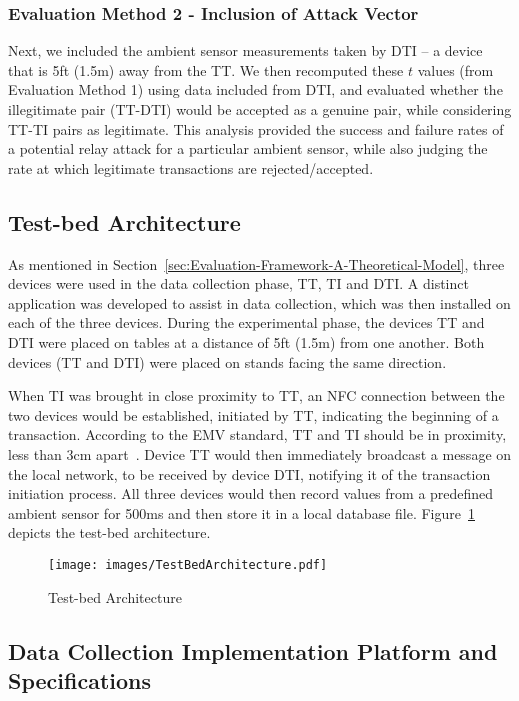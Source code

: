 \documentclass[runningheads,a4paper]{llncs}
\begin{document}
\subsubsection{Evaluation Method 2 - Inclusion of Attack Vector}
Next, we included the ambient sensor measurements taken by DTI -- a device that is 5ft (1.5m) away from the TT. We then recomputed these $t$ values (from Evaluation Method 1) using data included from DTI, and evaluated whether the illegitimate pair (TT-DTI) would be accepted as a genuine pair, while considering TT-TI pairs as legitimate. This analysis provided the success and failure rates of a potential relay attack for a particular ambient sensor, while also judging the rate at which legitimate transactions are rejected/accepted.


\subsection{Test-bed Architecture}
\label{sec:Test-bed-Architecture}

As mentioned in Section~\ref{sec:Evaluation-Framework-A-Theoretical-Model}, three devices were used in the data collection phase, TT, TI and DTI\@.  A distinct application was developed to assist in data collection, which was then installed on each of the three devices.  During the experimental phase, the devices TT and DTI were placed on tables at a distance of 5ft (1.5m) from one another.  Both devices (TT and DTI) were placed on stands facing the same direction.

When TI was brought in close proximity to TT, an NFC connection between the two devices would be established, initiated by TT, indicating the beginning of a transaction.
According to the EMV standard, TT and TI should be in proximity, less than 3cm apart~\cite{EVM2015-ContactlessArchitectureReq}.
Device TT would then immediately broadcast a message on the local network, to be received by device DTI, notifying it of the transaction initiation process.
All three devices would then record values from a predefined ambient sensor for 500ms and then store it in a local database file.
Figure~\ref{fig:architecture} depicts the test-bed architecture.

\begin{figure}
	\centering
	\texttt{[image: images/TestBedArchitecture.pdf]}
	\caption{Test-bed Architecture}
	\label{fig:architecture}
\end{figure}


\subsection{Data Collection Implementation Platform and Specifications}
\end{document}
